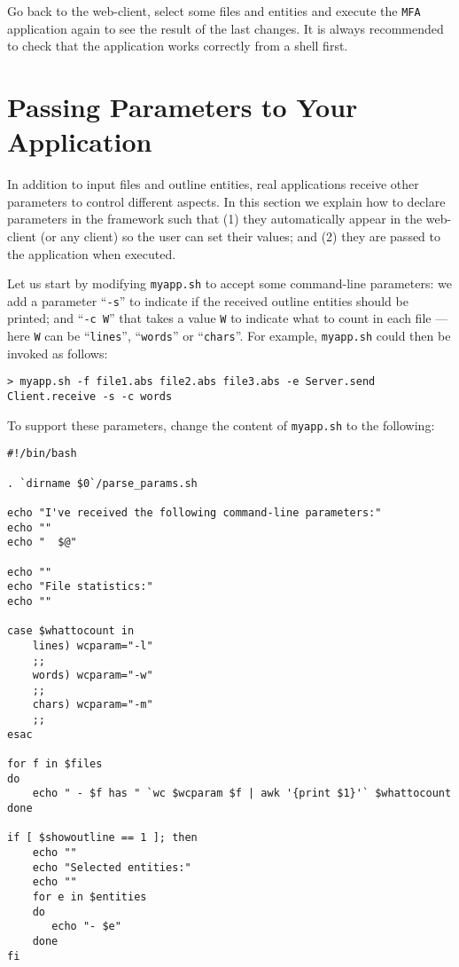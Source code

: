 Go back to the web-client, select some files and entities and execute
the \texttt{MFA} application again to see the result of the last
changes. It is always recommended to check that the application works
correctly from a shell first.

\section{Passing Parameters to Your Application}

In addition to input files and outline entities, real applications
receive other parameters to control different aspects. In this section
we explain how to declare parameters in the \ei framework such that
(1) they automatically appear in the web-client (or any client) so the
user can set their values; and (2) they are passed to the application
when executed.

Let us start by modifying \texttt{myapp.sh} to accept some
command-line parameters: we add a parameter ``\texttt{-s}'' to
indicate if the received outline entities should be printed; and
``\texttt{-c W}'' that takes a value \texttt{W} to indicate what to
count in each file --- here \texttt{W} can be ``\texttt{lines}'',
``\texttt{words}'' or ``\texttt{chars}''.
%
For example, \texttt{myapp.sh} could then be invoked as follows:


\medskip
\begin{lstlisting}
> myapp.sh -f file1.abs file2.abs file3.abs -e Server.send Client.receive -s -c words
\end{lstlisting}

\medskip
\noindent
To support these parameters, change the content of \texttt{myapp.sh}
to the following:

\medskip
\begin{lstlisting}[style=script]
#!/bin/bash

. `dirname $0`/parse_params.sh

echo "I've received the following command-line parameters:"
echo ""
echo "  $@"

echo ""
echo "File statistics:"
echo ""

case $whattocount in
    lines) wcparam="-l"
    ;;
    words) wcparam="-w"
    ;;
    chars) wcparam="-m"
    ;;
esac

for f in $files 
do
    echo " - $f has " `wc $wcparam $f | awk '{print $1}'` $whattocount
done

if [ $showoutline == 1 ]; then
    echo ""
    echo "Selected entities:"
    echo ""
    for e in $entities 
    do
       echo "- $e"
    done
fi
\end{lstlisting}

